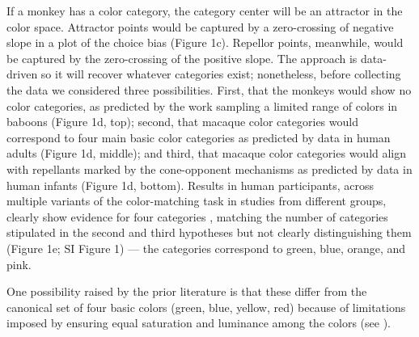 If a monkey has a color category, the category center will be an attractor in the color space. Attractor points would be captured by a zero-crossing of negative slope in a plot of the choice bias (Figure 1c). 
Repellor points, meanwhile, would be captured by the zero-crossing of the positive slope. The approach is data-driven so it will recover whatever categories exist; nonetheless, before collecting the data we considered three possibilities. 
First, that the monkeys would show no color categories, as predicted by the work sampling a limited range of colors in baboons \citep{davidoff_cross-species_2010}
(Figure 1d, top);
second, that macaque color categories would correspond to  four main basic color categories as predicted by data in human adults (Figure 1d, middle); 
and third, that macaque color categories would align with repellants marked by the cone-opponent mechanisms as predicted by data in human infants \citep{skelton_biological_2017} (Figure 1d, bottom). 
Results in human participants, across multiple variants of the color-matching task in studies from different groups, clearly show evidence for four categories \citep{bae_why_2015,panichello_error-correcting_2019}, matching the number of categories stipulated in the second and third hypotheses but not clearly distinguishing them (Figure 1e; SI Figure 1) — the categories correspond to green, blue, orange, and pink. 

One possibility raised by the prior literature is that these differ from the canonical set of four basic colors (green, blue, yellow, red) because of limitations imposed by ensuring equal saturation and luminance among the colors (see \citep{bae_why_2015}). 
